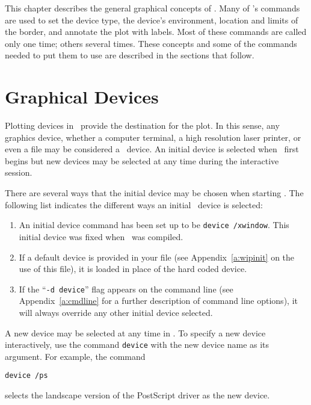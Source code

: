 %
%

This chapter describes the general graphical concepts of \wip.
Many of \wip's commands are used to set the device type,
the device's environment,
location and limits of the border,
and annotate the plot with labels.
Most of these commands are called only one time; others several times.
These concepts and some of the commands needed to put them to use are
described in the sections that follow.

\section{Graphical Devices}

Plotting devices in \wip\ provide the destination for the plot.
In this sense, any graphics device, whether a computer terminal,
a high resolution laser printer, or even a file
may be considered a \wip\ device.
An initial device is selected when \wip\ first begins but
new devices may be
selected at any time during the interactive session.

There are several ways that the initial device may be chosen
when starting \wip.
The following list indicates the different ways an
initial \wip\ device is selected:
\begin{enumerate}
  \item An initial device command has been set up to be
    {\tt device /xwindow}.
    This initial device was fixed when \wip\ was compiled.
  \item If a default device is provided in
    your \wipinit{} file
    (see Appendix~\ref{a:wipinit} on the use of this file),
    it is loaded in place of the hard coded device.
  \item If the ``{\tt -d device}'' flag appears on the command line
    (see Appendix~\ref{a:cmdline} for a further description of
    command line options),
    it will always override any other initial device selected.
\end{enumerate}

A new device may be selected at any time in \wip.
To specify a new device interactively,
use the command {\tt device}
with the new device name as its argument.
For example, the command
\begin{wiplist}%
  \item {\tt device /ps}
\end{wiplist}
selects the landscape version of the PostScript driver as the new device.

